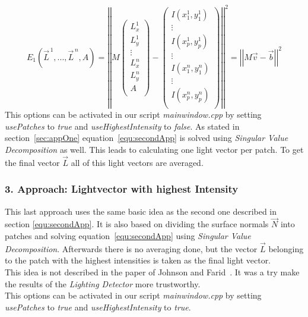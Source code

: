 \begin{equation}
\label{equ:secondApp}
E_{1}(\vec{L}^{\,1} , ... , \vec{L}^{\,n} , A) = 
\left\vert \left\vert 
M
\begin{pmatrix}
L^{1}_{x} \\
L^{1}_{y} \\
\vdots  \\
L^{n}_{x} \\
L^{n}_{y} \\
A \\
\end{pmatrix} -
\begin{pmatrix}
I(x^{1}_{1} , y^{1}_{1}) \\
\vdots  \\
I(x^{1}_{p} , y^{1}_{p}) \\
\vdots  \\
I(x^{n}_{1} , y^{n}_{1}) \\
\vdots  \\
I(x^{n}_{p} , y^{n}_{p}) \\
\end{pmatrix}
 \right\vert\right\vert^{2}
 = \left\vert \left\vert  M\vec{v}-\vec{b}  \right\vert\right\vert^{2}
\end{equation}
This options can be activated in our script \textit{mainwindow.cpp} by setting \textit{usePatches} to \textit{true} and \textit{useHighestIntensity} to \textit{false}.
As stated in section~\ref{sec:appOne} equation~\ref{equ:secondApp} is solved using \textit{Singular Value Decomposition} as well. This leads to calculating one light vector per patch. To get the final vector $\vec{L}$ all of this light vectors are averaged.


\subsubsection{3. Approach: Lightvector with highest Intensity}\label{sec:appThree}
This last approach uses the same basic idea as the second one described in section \ref{equ:secondApp}. It is also based on dividing the surface normals $\vec{N}$ into patches and solving equation~\ref{equ:secondApp} using \textit{Singular Value Decomposition}. Afterwards there is no averaging done, but the vector $\vec{L}$ belonging to the patch with the highest intensities is taken as the final light vector. \\
This idea is not described in the paper of Johnson and Farid~\cite{Johnson}. It was a try make the results of the \textit{Lighting Detector} more trustworthy. \\
This options can be activated in our script \textit{mainwindow.cpp} by setting \textit{usePatches} to \textit{true} and \textit{useHighestIntensity} to \textit{true}.

\newpage